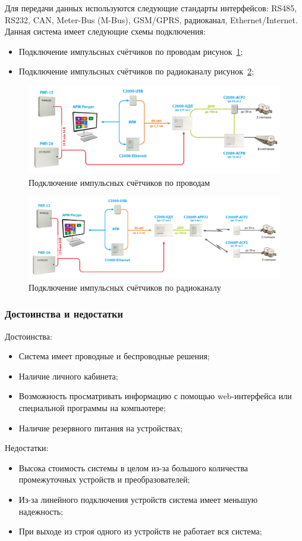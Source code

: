 Для передачи данных используются следующие стандарты интерфейсов: RS485, RS232, CAN, Meter-Bus (M-Bus), GSM/GPRS, радиоканал, Ethernet/Internet.
Данная система имеет следующие схемы подключения:
\begin{itemize}
	\item Подключение импульсных счётчиков по проводам рисунок~\ref{fig:impuls};
	\item Подключение импульсных счётчиков по радиоканалу рисунок~\ref{fig:radio};
\end{itemize}

\begin{figure}[H]
	\centering
	\includegraphics[width=0.7\linewidth]{pics/impuls}
	\caption{Подключение импульсных счётчиков по проводам}
	\label{fig:impuls}
\end{figure}

\begin{figure}[H]
	\centering
	\includegraphics[width=0.7\linewidth]{pics/radio}
	\caption{Подключение импульсных счётчиков по радиоканалу}
	\label{fig:radio}
\end{figure}

\subsubsection{Достоинства и недостатки}

Достоинства:
\begin{itemize}
	\item Система имеет проводные и беспроводные решения;
	\item Наличие личного кабинета; 
	\item Возможность просматривать информацию с помощью web-интерфейса или специальной программы на компьютере;
	\item Наличие резервного питания на устройствах;
\end{itemize}
Недостатки:
\begin{itemize}
	\item Высока стоимость системы в целом из-за большого количества промежуточных устройств и преобразователей;
	\item Из-за линейного подключения устройств система имеет меньшую надежность; \item При выходе из строя одного из устройств не работает вся система;
\end{itemize}

